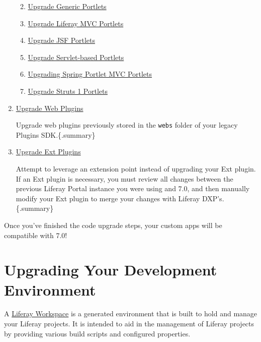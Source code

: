 \begin{enumerate}
  \begin{enumerate}
  \def\labelenumii{\arabic{enumii}.}
  \item
    \href{/docs/7-2/tutorials/-/knowledge_base/t/upgrading-a-genericportlet}{Upgrade
    Generic Portlets}
  \item
    \href{/docs/7-2/tutorials/-/knowledge_base/t/upgrading-a-liferay-mvc-portlet}{Upgrade
    Liferay MVC Portlets}
  \item
    \href{/docs/7-2/tutorials/-/knowledge_base/t/upgrading-a-liferay-jsf-portlet}{Upgrade
    JSF Portlets}
  \item
    \href{/docs/7-2/tutorials/-/knowledge_base/t/upgrading-a-servlet-based-portlet}{Upgrade
    Servlet-based Portlets}
  \item
    \href{/docs/7-2/tutorials/-/knowledge_base/t/upgrading-a-spring-portlet-mvc-portlet}{Upgrading
    Spring Portlet MVC Portlets}
  \item
    \href{/docs/7-2/tutorials/-/knowledge_base/t/upgrading-a-struts-1-portlet}{Upgrade
    Struts 1 Portlets}
  \end{enumerate}
\item
  \href{/docs/7-2/tutorials/-/knowledge_base/t/upgrading-web-plugins}{Upgrade
  Web Plugins}

  Upgrade web plugins previously stored in the \texttt{webs} folder of
  your legacy Plugins SDK.\{.summary\}
\item
  \href{/docs/7-2/tutorials/-/knowledge_base/t/upgrading-ext-plugins}{Upgrade
  Ext Plugins}

  Attempt to leverage an extension point instead of upgrading your Ext
  plugin. If an Ext plugin is necessary, you must review all changes
  between the previous Liferay Portal instance you were using and 7.0,
  and then manually modify your Ext plugin to merge your changes with
  Liferay DXP's.\{.summary\}
\end{enumerate}

Once you've finished the code upgrade steps, your custom apps will be
compatible with 7.0!

\chapter{Upgrading Your Development
Environment}\label{upgrading-your-development-environment}

A
\href{/docs/7-2/reference/-/knowledge_base/r/liferay-workspace}{Liferay
Workspace} is a generated environment that is built to hold and manage
your Liferay projects. It is intended to aid in the management of
Liferay projects by providing various build scripts and configured
properties.

